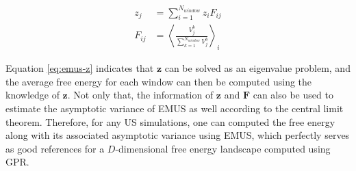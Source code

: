\begin{spacing}{2.0}
    \begin{equation}\begin{aligned}
        z_j &= \sum_{i=1}^{N_{window}} z_i F_{ij} \\
        F_{ij} &= \left<\frac{V_j^b}{\sum_{k=1}^{N_{window}}V_j^b}\right>_i
        \label{eq:emus-z}
    \end{aligned}\end{equation}

    Equation \ref{eq:emus-z} indicates that $\mathbf{z}$ can be solved as an eigenvalue problem, and the average free energy for each window
    can then be computed using the knowledge of $\mathbf{z}$. Not only that, the information of $\mathbf{z}$ and $\mathbf{F}$ can also be used
    to estimate the asymptotic variance of EMUS as well according to the central limit theorem. Therefore, for any US simulations, one can
    computed the free energy along with its associated asymptotic variance using EMUS, which perfectly serves as good references for a 
    $D$-dimensional free energy landscape computed using GPR.
\end{spacing}

